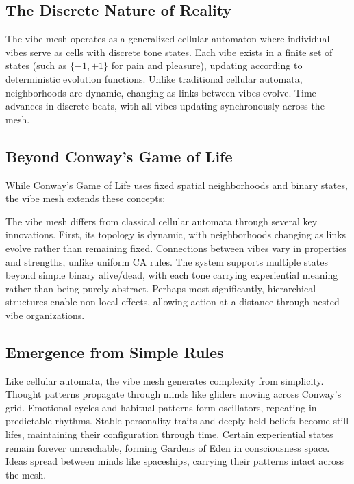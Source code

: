 \subsection{The Discrete Nature of Reality}

\begin{proposition}
The vibe mesh operates as a generalized cellular automaton where individual vibes serve as cells with discrete tone states. Each vibe exists in a finite set of states (such as $\{-1, +1\}$ for pain and pleasure), updating according to deterministic evolution functions. Unlike traditional cellular automata, neighborhoods are dynamic, changing as links between vibes evolve. Time advances in discrete beats, with all vibes updating synchronously across the mesh.
\end{proposition}

\subsection{Beyond Conway's Game of Life}

While Conway's Game of Life uses fixed spatial neighborhoods and binary states, the vibe mesh extends these concepts:

\begin{theorem}
The vibe mesh differs from classical cellular automata through several key innovations. First, its topology is dynamic, with neighborhoods changing as links evolve rather than remaining fixed. Connections between vibes vary in properties and strengths, unlike uniform CA rules. The system supports multiple states beyond simple binary alive/dead, with each tone carrying experiential meaning rather than being purely abstract. Perhaps most significantly, hierarchical structures enable non-local effects, allowing action at a distance through nested vibe organizations.
\end{theorem}

\subsection{Emergence from Simple Rules}

\begin{proposition}
Like cellular automata, the vibe mesh generates complexity from simplicity. Thought patterns propagate through minds like gliders moving across Conway's grid. Emotional cycles and habitual patterns form oscillators, repeating in predictable rhythms. Stable personality traits and deeply held beliefs become still lifes, maintaining their configuration through time. Certain experiential states remain forever unreachable, forming Gardens of Eden in consciousness space. Ideas spread between minds like spaceships, carrying their patterns intact across the mesh.
\end{proposition}

